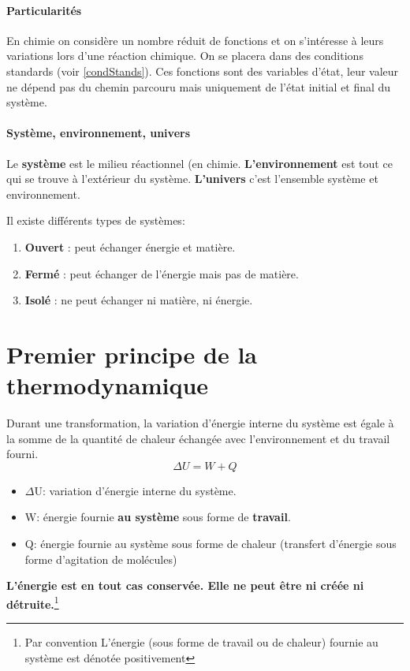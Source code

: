 \documentclass[10pt,a4paper]{book}
\begin{document}
\paragraph{Particularités} En chimie on  considère un nombre réduit de fonctions et on s'intéresse à leurs variations lors d'une réaction chimique. On se placera dans des conditions standards (voir \ref{condStands}). Ces fonctions sont des variables d'état, leur valeur ne dépend pas du chemin parcouru mais uniquement de l'état initial et final du système.
\paragraph{Système, environnement, univers} Le \textbf{système} est le milieu réactionnel (en chimie. \textbf{L'environnement} est tout ce qui se trouve à l'extérieur du système. \textbf{L'univers} c'est l'ensemble système et environnement. \par 
Il existe différents types de systèmes: 
\begin{enumerate}
\item \textbf{Ouvert} : peut échanger énergie et matière.
\item \textbf{Fermé} : peut échanger de l'énergie  mais pas de matière.
\item \textbf{Isolé} : ne peut échanger ni matière, ni énergie.
\end{enumerate}

\section{Premier principe de la thermodynamique}

\par Durant une transformation, la variation d’énergie interne du système est égale
à la somme de la quantité de chaleur échangée avec l’environnement
et du travail fourni.
\begin{displaymath}
\Delta U = W + Q
\end{displaymath}
\begin{itemize}
\item $\Delta$U: variation d'énergie interne du système.
\item W: énergie fournie \textbf{au système} sous forme de \textbf{travail}.
\item Q: énergie fournie au système sous forme de chaleur (transfert d’énergie sous forme d’agitation de molécules)
\end{itemize}
\textbf{L'énergie est en tout cas conservée. Elle ne peut être ni créée ni détruite.}\footnote{Par convention L’énergie (sous forme de travail ou de chaleur) fournie au système est dénotée positivement}
\end{document}
